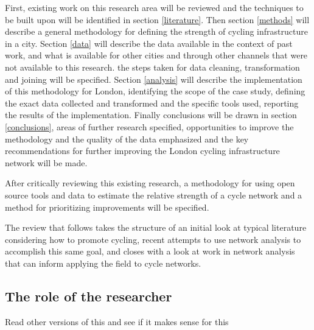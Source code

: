 First, existing work on this research area will be reviewed and the techniques to be built upon will be identified in section \ref{literature}.  Then  section \ref{methods} will describe a general methodology for defining the strength of cycling infrastructure in a city. Section \ref{data} will describe the data available in the context of past work, and what is available for other cities and through other channels that were not available to this research. the steps taken for data cleaning, transformation and joining will be specified. Section \ref{analysis} will describe the implementation of this methodology for London, identifying the scope of the case study, defining the exact data collected and transformed and the specific tools used, reporting the results of the implementation. Finally conclusions will be drawn in section \ref{conclusions}, areas of further research specified, opportunities to improve the methodology and the quality of the data emphasized and the key recommendations for further improving the London cycling infrastructure network will be made. 

After critically reviewing this existing research, a methodology for using open source tools and data to estimate the relative strength of a cycle network and a method for prioritizing improvements will be specified.

The review that follows takes the structure of an initial look at typical literature considering how to promote cycling, recent attempts to use network analysis to accomplish this same goal, and closes with a look at work in network analysis that can inform applying the field to cycle networks.

\subsection{The role of the researcher}

Read other versions of this and see if it makes sense for this 


